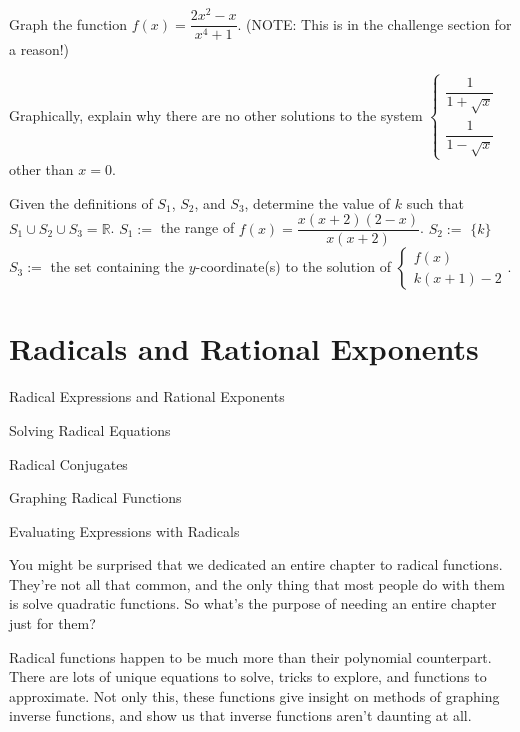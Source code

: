 \documentclass[lang=en,11pt]{elegantbook}
\begin{document}
\begin{challengeset}
\item Graph the function $f(x)=\dfrac{2x^2-x}{x^4+1}$. (NOTE: This is in the challenge section for a reason!) \vspace{3mm}
\item Graphically, explain why there are no other solutions to the system $\begin{cases} \dfrac{1}{1+\sqrt{x}} \\ \dfrac{1}{1-\sqrt{x}} \end{cases}$ other than $x=0$.
\item Given the definitions of $S_1$, $S_2$, and $S_3$, determine the value of $k$ such that $S_1\cup S_2\cup S_3=\mathbb{R}$. \newline 
$S_1:=$ the range of $f(x)=\dfrac{x(x+2)(2-x)}{x(x+2)}$. \newline 
$S_2:=$ $\{k\}$ \newline 
$S_3:=$ the set containing the $y$-coordinate(s) to the solution of $\begin{cases} f(x) \\ k(x+1)-2\end{cases}$. \vspace{3mm}
\end{challengeset}
\chapter{Radicals and Rational Exponents}
\begin{introduction}[Contents]
\item Radical Expressions and Rational Exponents
\item Solving Radical Equations
\item Radical Conjugates
\item Graphing Radical Functions
\item Evaluating Expressions with Radicals
\end{introduction}
\noindent You might be surprised that we dedicated an entire chapter to radical functions.  They're not all that common, and the only thing that most people do with them is solve quadratic functions.  So what's the purpose of needing an entire chapter just for them?

Radical functions happen to be much more than their polynomial counterpart.  There are lots of unique equations to solve, tricks to explore, and functions to approximate.  Not only this, these functions give insight on methods of graphing inverse functions, and show us that inverse functions aren't daunting at all.
\end{document}
